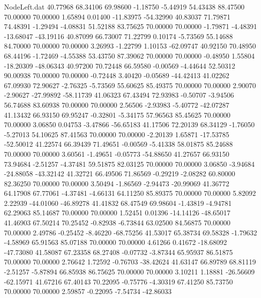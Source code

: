 \begin{filecontents}{NodeLeft.dat}
  40.77968   68.34106   69.98600    -1.18750   -5.44919   54.43438   88.47500   70.00000   70.00000    1.65894    0.01400  -11.83975  -54.32990
  40.83037   71.79871   74.48391    -1.29494   -4.08831   51.52188   83.75625   70.00000   70.00000   -1.79871   -4.48391  -13.68047  -43.19116
  40.87099   66.73007   71.22799     0.10174   -5.73569   55.14688   84.70000   70.00000   70.00000    3.26993   -1.22799    1.10153  -62.09747
  40.92150   70.48950   68.44196    -1.72469   -4.55388   53.43750   87.39062   70.00000   70.00000   -0.48950    1.55804  -18.20309  -48.06343
  40.97200   70.72448   66.59580    -0.00569   -4.44644   52.50312   90.00938   70.00000   70.00000   -0.72448    3.40420   -0.05689  -44.42413
  41.02262   67.09930   72.90627    -2.76325   -5.73569   55.60625   85.49375   70.00000   70.00000    2.90070   -2.90627  -27.99892  -58.11739
  41.06323   67.43494   72.93983    -0.50707   -3.94506   56.74688   83.60938   70.00000   70.00000    2.56506   -2.93983   -5.40772  -42.07287
  41.13432   66.93150   69.95247    -0.32801   -5.34175   57.96563   85.45625   70.00000   70.00000    3.06850    0.04753   -3.47866  -56.65183
  41.17506   72.20139   68.34129    -1.76050   -5.27013   54.10625   87.41563   70.00000   70.00000   -2.20139    1.65871  -17.53785  -52.50012
  41.22574   66.39439   71.49651    -0.00569   -5.41338   58.01875   85.24688   70.00000   70.00000    3.60561   -1.49651   -0.05773  -54.88650
  41.27657   66.93150   73.94684    -2.51257   -4.37481   59.51875   82.03125   70.00000   70.00000    3.06850   -3.94684  -24.88058  -43.32142
  41.32721   66.49506   71.86569    -0.29219   -2.08282   60.80000   82.36250   70.00000   70.00000    3.50494   -1.86569   -2.94473  -20.99069
  41.36772   64.17908   67.77061    -4.37481   -4.66131   64.11250   85.89375   70.00000   70.00000    5.82092    2.22939  -44.01060  -46.89278
  41.41832   68.47549   69.98604    -1.43819   -4.94781   62.29063   85.14687   70.00000   70.00000    1.52451    0.01396  -14.14126  -48.65017
  41.46903   67.50214   70.25452    -0.82938   -6.73844   63.02500   84.56875   70.00000   70.00000    2.49786   -0.25452   -8.46220  -68.75256
  41.53017   65.38734   69.58328    -1.79632   -4.58969   65.91563   85.07188   70.00000   70.00000    4.61266    0.41672  -18.68092  -47.73080
  41.58087   67.23358   68.27408    -0.07732   -3.87344   65.95937   86.51875   70.00000   70.00000    2.76642    1.72592   -0.76703  -38.42624
  41.63147   66.89789   68.81119    -2.51257   -5.87894   66.85938   86.75625   70.00000   70.00000    3.10211    1.18881  -26.56609  -62.15971
  41.67216   67.40143   70.22095    -0.75776   -4.30319   67.41250   85.73750   70.00000   70.00000    2.59857   -0.22095   -7.54734  -42.86033

\end{filecontents}
